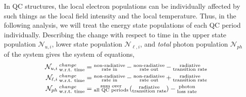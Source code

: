 \documentclass[12pt]{report}
\begin{document}
In QC structures, the local electron populations can be individually affected by such things as the local field intensity and the local temperature.  Thus, in the following analysis, we will treat the energy state populations of each QC period individually.  Describing the change with respect to time in the upper state population $\mathcal{N}_{u,i}$, lower state population $\mathcal{N}_{\ell,i}$, and \emph{total} photon population $\mathcal{N}_{ph}$ of the system gives the system of equations,
\begin{subequations}
\label{chpt1eqn:req_words}
\begin{align}
\mathcal{N}_{u,i}\: \begin{subarray} \tn{change}\\\tn{w.r.t. time}\end{subarray} &= \begin{subarray}{c}\tn{non-radiative}\\\tn{rate in}\end{subarray} - \begin{subarray}{c}\tn{non-radiative}\\\tn{rate out}\end{subarray} - \begin{subarray}{c}\tn{radiative}\\\tn{transition rate}\end{subarray}\\
\mathcal{N}_{\ell,i}\: \begin{subarray} \tn{change}\\\tn{w.r.t. time}\end{subarray} &= \begin{subarray}{c}\tn{non-radiative}\\\tn{rate in}\end{subarray} - \begin{subarray}{c}\tn{non-radiative}\\\tn{rate out}\end{subarray} + \begin{subarray}{c}\tn{radiative}\\\tn{transition rate}\end{subarray}\\
\mathcal{N}_{ph}\: \begin{subarray} \tn{change}\\\tn{w.r.t. time}\end{subarray} &= \begin{subarray}{c}\tn{sum over}\\\tn{all QC periods}\end{subarray} \left(\begin{subarray}{c}\tn{radiative}\\\tn{transition rate}\end{subarray}\right) - \begin{subarray}{c}\tn{photon}\\\tn{loss rate}\end{subarray}
\end{align}
\end{subequations}
\end{document}
